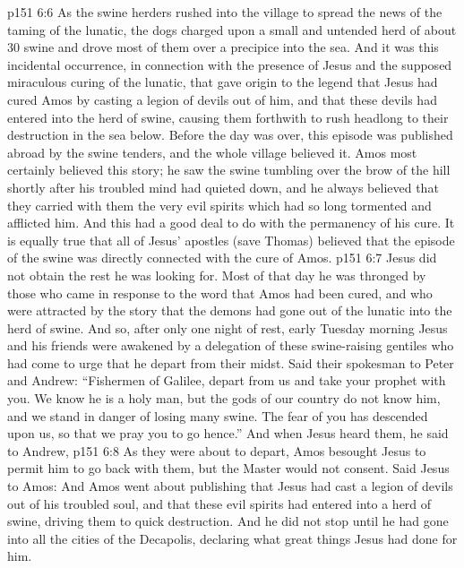 \vs p151 6:6 As the swine herders rushed into the village to spread the news of the taming of the lunatic, the dogs charged upon a small and untended herd of about 30 swine and drove most of them over a precipice into the sea. And it was this incidental occurrence, in connection with the presence of Jesus and the supposed miraculous curing of the lunatic, that gave origin to the legend that Jesus had cured Amos by casting a legion of devils out of him, and that these devils had entered into the herd of swine, causing them forthwith to rush headlong to their destruction in the sea below. Before the day was over, this episode was published abroad by the swine tenders, and the whole village believed it. Amos most certainly believed this story; he saw the swine tumbling over the brow of the hill shortly after his troubled mind had quieted down, and he always believed that they carried with them the very evil spirits which had so long tormented and afflicted him. And this had a good deal to do with the permanency of his cure. It is equally true that all of Jesus’ apostles (save Thomas) believed that the episode of the swine was directly connected with the cure of Amos.
\vs p151 6:7 \pc Jesus did not obtain the rest he was looking for. Most of that day he was thronged by those who came in response to the word that Amos had been cured, and who were attracted by the story that the demons had gone out of the lunatic into the herd of swine. And so, after only one night of rest, early Tuesday morning Jesus and his friends were awakened by a delegation of these swine\hyp{}raising gentiles who had come to urge that he depart from their midst. Said their spokesman to Peter and Andrew: “Fishermen of Galilee, depart from us and take your prophet with you. We know he is a holy man, but the gods of our country do not know him, and we stand in danger of losing many swine. The fear of you has descended upon us, so that we pray you to go hence.” And when Jesus heard them, he said to Andrew, 
\vs p151 6:8 As they were about to depart, Amos besought Jesus to permit him to go back with them, but the Master would not consent. Said Jesus to Amos:  And Amos went about publishing that Jesus had cast a legion of devils out of his troubled soul, and that these evil spirits had entered into a herd of swine, driving them to quick destruction. And he did not stop until he had gone into all the cities of the Decapolis, declaring what great things Jesus had done for him.

